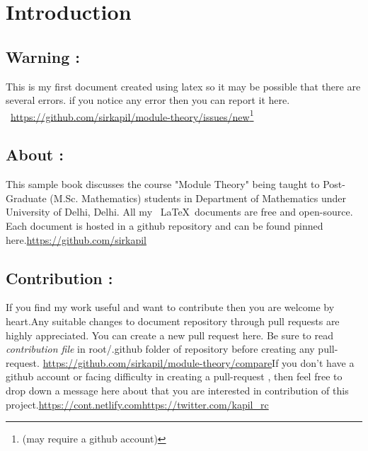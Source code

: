 \documentclass{tufte-book}
\theoremstyle{theorem}
\numberwithin{equation}{chapter}
\begin{document}
\chapter*{Introduction}
\section{Warning :}
This is my first document created using latex so it may be possible that there are several errors. if you notice any  error then you can report it here.\newline
\ \url{https://github.com/sirkapil/module-theory/issues/new}\footnote{(may require a github account)}
\section{About :}
This sample book discusses the course "Module Theory" being taught to Post-Graduate (M.Sc. Mathematics) students in Department of Mathematics under University of Delhi, Delhi.\newline \bigskip
All my \ \LaTeX \ documents are free and open-source. Each document is hosted in a github repository and can be found pinned here.\newline \url{https://github.com/sirkapil} 

\section{Contribution :}
If you find my work useful and want to contribute then you are welcome by heart.\newline Any suitable changes to document repository through pull requests are highly appreciated. You can create a new pull request here. Be sure to read \textit{contribution file} in root/.github folder of repository before creating any pull-request. \newline\url{https://github.com/sirkapil/module-theory/compare}\newline\bigskip If you don't have a github account or facing difficulty in creating a pull-request , then feel free to drop down a message here about that you are interested in contribution of this project.\newline \url{https://cont.netlify.com}\newline\url{https://twitter.com/kapil_rc}

\mainmatter



\backmatter

\end{document}
